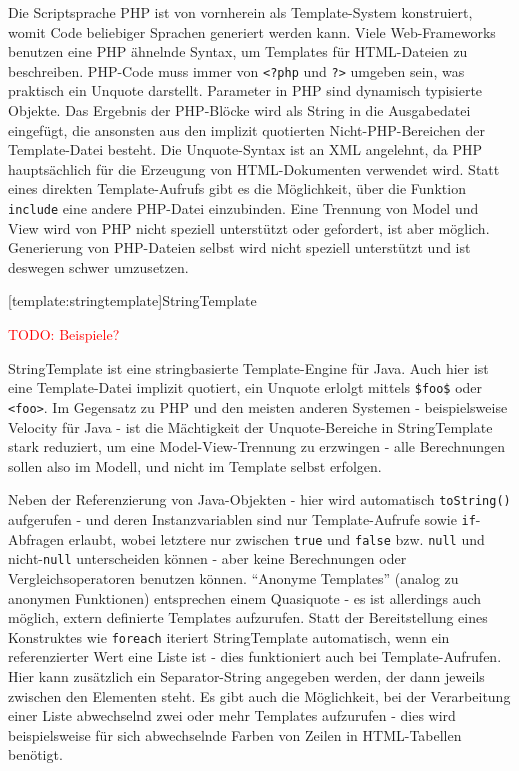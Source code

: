 \documentclass[11pt, a4paper, bibgerm]{scrbook}
\newcommand\icode[1]{\lstinline?#1?}
\newcommand\phpo{\lstinline+<?php+}
\newcommand\phpc{\lstinline+?>+}
\newcommand{\todo}[1]{
  \textcolor{red}{TODO: #1}
}
\newcommand\lsection{}
\begin{document}
Die Scriptsprache PHP ist von vornherein als Template-System
konstruiert, womit Code beliebiger Sprachen generiert werden kann. Viele
Web-Frameworks benutzen eine PHP ähnelnde Syntax, um Templates für
HTML-Dateien zu beschreiben. PHP-Code muss immer von \phpo{} und \phpc{}
umgeben sein, was praktisch ein Unquote darstellt. Parameter in PHP sind
dynamisch typisierte Objekte. Das Ergebnis der PHP-Blöcke wird als
String in die Ausgabedatei eingefügt, die ansonsten aus den implizit
quotierten Nicht-PHP-Bereichen der Template-Datei besteht. Die
Unquote-Syntax ist an XML angelehnt, da PHP hauptsächlich für die
Erzeugung von HTML-Dokumenten verwendet wird. Statt eines direkten
Template-Aufrufs gibt es die Möglichkeit, über die Funktion
\icode{include} eine andere PHP-Datei einzubinden. Eine Trennung von
Model und View wird von PHP nicht speziell unterstützt oder gefordert,
ist aber möglich. Generierung von PHP-Dateien selbst wird nicht speziell
unterstützt und ist deswegen schwer umzusetzen.

\lsection[template:stringtemplate]{StringTemplate}

\todo{Beispiele?}

StringTemplate\cite{StringTemplate} ist eine stringbasierte
Template-Engine für Java. Auch hier ist eine Template-Datei implizit
quotiert, ein Unquote erlolgt mittels \icode{$foo$} oder
\icode{<foo>}. Im Gegensatz zu PHP und den meisten anderen Systemen -
beispielsweise Velocity\cite{Velocity} für Java - ist
die Mächtigkeit der Unquote-Bereiche in StringTemplate stark reduziert,
um eine Model-View-Trennung zu erzwingen - alle Berechnungen sollen also
im Modell, und nicht im Template selbst erfolgen.

Neben der Referenzierung von Java-Objekten - hier wird automatisch
\icode{toString()} aufgerufen - und deren Instanzvariablen sind nur
Template-Aufrufe sowie \icode{if}-Abfragen erlaubt, wobei letztere nur
zwischen \icode{true} und \icode{false} bzw. \icode{null} und
nicht-\icode{null} unterscheiden können - aber keine Berechnungen oder
Vergleichsoperatoren benutzen können. "`Anonyme Templates"' (analog zu
anonymen Funktionen) entsprechen einem Quasiquote - es ist allerdings
auch möglich, extern definierte Templates aufzurufen. Statt der
Bereitstellung eines Konstruktes wie \icode{foreach} iteriert
StringTemplate automatisch, wenn ein referenzierter Wert eine Liste ist
- dies funktioniert auch bei Template-Aufrufen. Hier kann zusätzlich ein
Separator-String angegeben werden, der dann jeweils zwischen den
Elementen steht. Es gibt auch die Möglichkeit, bei der Verarbeitung
einer Liste abwechselnd zwei oder mehr Templates aufzurufen - dies wird
beispielsweise für sich abwechselnde Farben von Zeilen in HTML-Tabellen
benötigt.
\end{document}
